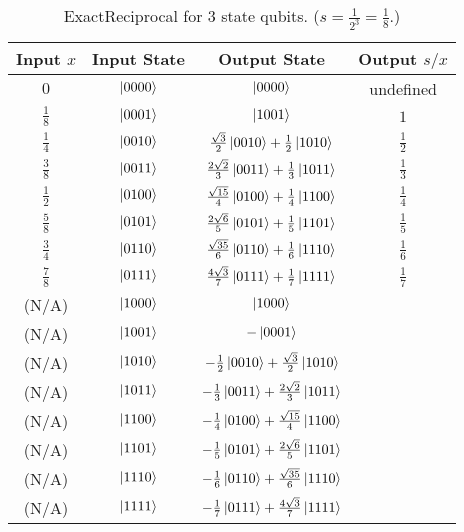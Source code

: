 \documentclass[12pt]{extarticle}
\begin{document}
\begin{table}[h!]
\centering
\begin{tabular}{|c|c|c|c|}
\hline
Input $x$     & Input State  & Output State                                               & Output $s/x$  \\
\hline
$0$           & $\ket{0000}$ & $\ket{0000}$                                               & undefined     \\
$\frac{1}{8}$ & $\ket{0001}$ & $ \ket{1001}$                                              & $1$           \\
$\frac{1}{4}$ & $\ket{0010}$ & $\frac{\sqrt{3}}{2} \ket{0010} + \frac{1}{2} \ket{1010}$   & $\frac{1}{2}$ \\
$\frac{3}{8}$ & $\ket{0011}$ & $\frac{2\sqrt{2}}{3} \ket{0011} + \frac{1}{3} \ket{1011}$  & $\frac{1}{3}$ \\
$\frac{1}{2}$ & $\ket{0100}$ & $\frac{\sqrt{15}}{4} \ket{0100} + \frac{1}{4} \ket{1100}$  & $\frac{1}{4}$ \\
$\frac{5}{8}$ & $\ket{0101}$ & $\frac{2\sqrt{6}}{5} \ket{0101} + \frac{1}{5} \ket{1101}$  & $\frac{1}{5}$ \\
$\frac{3}{4}$ & $\ket{0110}$ & $\frac{\sqrt{35}}{6} \ket{0110} + \frac{1}{6} \ket{1110}$  & $\frac{1}{6}$ \\
$\frac{7}{8}$ & $\ket{0111}$ & $\frac{4\sqrt{3}}{7} \ket{0111} + \frac{1}{7} \ket{1111}$  & $\frac{1}{7}$ \\
(N/A)         & $\ket{1000}$ & $\ket{1000}$                                               & \\
(N/A)         & $\ket{1001}$ & $-\ket{0001}$                                              & \\
(N/A)         & $\ket{1010}$ & $-\frac{1}{2} \ket{0010} + \frac{\sqrt{3}}{2} \ket{1010}$  & \\
(N/A)         & $\ket{1011}$ & $-\frac{1}{3} \ket{0011} + \frac{2\sqrt{2}}{3} \ket{1011}$ & \\
(N/A)         & $\ket{1100}$ & $-\frac{1}{4} \ket{0100} + \frac{\sqrt{15}}{4} \ket{1100}$ & \\
(N/A)         & $\ket{1101}$ & $-\frac{1}{5} \ket{0101} + \frac{2\sqrt{6}}{5} \ket{1101}$ & \\
(N/A)         & $\ket{1110}$ & $-\frac{1}{6} \ket{0110} + \frac{\sqrt{35}}{6} \ket{1110}$ & \\
(N/A)         & $\ket{1111}$ & $-\frac{1}{7} \ket{0111} + \frac{4\sqrt{3}}{7} \ket{1111}$ & \\
\hline
\end{tabular}
\caption{ExactReciprocal for 3 state qubits. ($s=\frac{1}{2^3}=\frac{1}{8}$.)}
\label{tab:exactreciprocal3}
\end{table}
\end{document}
